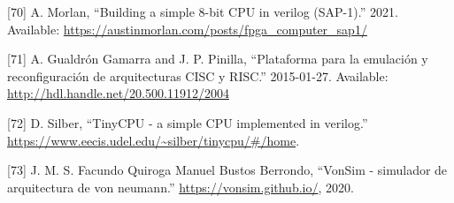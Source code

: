 \documentclass[12pt,oneside]{templates/unerthesis}
\newcommand{\CSLLeftMargin}[1]{#1} %
\newcommand{\CSLRightInline}[1]{#1} %
\newlength{\cslhangindent}
\newenvironment{CSLReferences}[2] %
 {\setlength{\parindent}{0pt}%
  \setlength{\leftskip}{#1 pt\relax}%
  \setlength{\parskip}{#2 pt\relax}%
  \everypar{\setlength{\hangindent}{\cslhangindent}}}
 {\par}
\begin{document}
\begin{CSLReferences}{0}{0}
\leavevmode{}%
\CSLLeftMargin{{[}70{]} }%
\CSLRightInline{A. Morlan, {``Building a simple 8-bit CPU in verilog (SAP-1).''} 2021. Available: \url{https://austinmorlan.com/posts/fpga_computer_sap1/}}

\leavevmode{}%
\CSLLeftMargin{{[}71{]} }%
\CSLRightInline{A. Gualdrón Gamarra and J. P. Pinilla, {``Plataforma para la emulación y reconfiguración de arquitecturas CISC y RISC.''} 2015-01-27. Available: \url{http://hdl.handle.net/20.500.11912/2004}}

\leavevmode{}%
\CSLLeftMargin{{[}72{]} }%
\CSLRightInline{D. Silber, {``TinyCPU - a simple CPU implemented in verilog.''} \url{https://www.eecis.udel.edu/~silber/tinycpu/\#/home}.}

\leavevmode{}%
\CSLLeftMargin{{[}73{]} }%
\CSLRightInline{J. M. S. Facundo Quiroga Manuel Bustos Berrondo, {``VonSim - simulador de arquitectura de von neumann.''} \url{https://vonsim.github.io/}, 2020.}

\end{CSLReferences}

%


\end{document}
